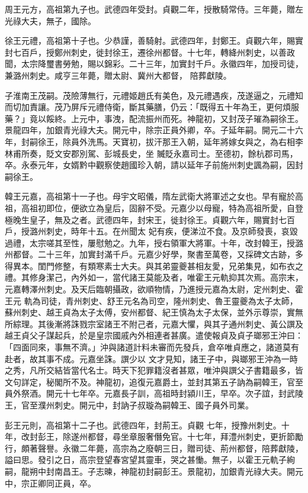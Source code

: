\begin{pinyinscope}
 周王元方，高祖第九子也。武德四年受封。貞觀二年，授散騎常侍。三年薨，贈左光祿大夫，無子，國除。



 徐王元禮，高祖第十子也。少恭謹，善騎射。武德四年，封鄭王。貞觀六年，賜實封七百戶，授鄭州刺史，徙封徐王，遷徐州都督。十七年，轉絳州刺史，以善政聞，太宗降璽書勞勉，賜以錦彩。二十三年，加實封千戶。永徽四年，加授司徒，兼潞州刺史。咸亨三年薨，贈太尉、冀州大都督，
 陪葬獻陵。



 子淮南王茂嗣。茂險薄無行，元禮姬趙氏有美色，及元禮遇疾，茂遂逼之，元禮知而切加責讓。茂乃屏斥元禮侍衛，斷其藥膳，仍云：「既得五十年為王，更何煩服藥？」竟以餒終。上元中，事洩，配流振州而死。神龍初，又封茂子璀為嗣徐王。景龍四年，加銀青光祿大夫。開元中，除宗正員外卿，卒。子延年嗣。開元二十六年，封嗣徐王，除員外洗馬。天寶初，拔汗那王入朝，延年將嫁女與之，為右相李林甫所奏，貶文安郡別駕、彭城長史，坐
 贓貶永嘉司士。至德初，餘杭郡司馬，卒。永泰元年，女婿黔中觀察使趙國珍入朝，請以延年子前施州刺史諷為嗣，因封嗣徐王。



 韓王元嘉，高祖第十一子也。母宇文昭儀，隋左武衛大將軍述之女也。早有寵於高祖，高祖初即位，便欲立為皇后，固辭不受。元嘉少以母寵，特為高祖所愛，自登極晚生皇子，無及之者。武德四年，封宋王，徙封徐王。貞觀六年，賜實封七百戶，授潞州刺史，時年十五。在州聞太
 妃有疾，便涕泣不食。及京師發喪，哀毀過禮，太宗嗟其至性，屢慰勉之。九年，授右領軍大將軍。十年，改封韓王，授潞州都督。二十三年，加實封滿千戶。元嘉少好學，聚書至萬卷，又採碑文古跡，多得異本。閨門修整，有類寒素士大夫。與其弟靈夔甚相友愛，兄弟集見，如布衣之禮。其修身潔己，內外如一，當代諸王莫能及者，唯霍王元軌抑其次焉。高宗末，元嘉轉澤州刺史。及天后臨朝攝政，欲順物情，乃進授元嘉為太尉，定州刺史、霍王元
 軌為司徒，青州刺史、舒王元名為司空，隆州刺史、魯王靈夔為太子太師，蘇州刺史、越王貞為太子太傅，安州都督、紀王慎為太子太保，並外示尊崇，實無所綜理。其後漸將誅戮宗室諸王不附己者，元嘉大懼，與其子通州刺史、黃公譔及越王貞父子謀起兵，於是皇宗國戚內外相連者甚廣。遣使報貞及貞子瑯邪王沖曰：「四面同來，事無不濟。」沖與諸道計料未審而先發兵，倉卒唯貞應之，諸道莫有赴者，故其事不成。元嘉坐誅。譔少以
 文才見知，諸王子中，與瑯邪王沖為一時之秀，凡所交結皆當代名士。時天下犯罪籍沒者甚眾，唯沖與譔父子書籍最多，皆文句詳定，秘閣所不及。神龍初，追復元嘉爵土，並封其第五子訥為嗣韓王，官至員外祭酒。開元十七年卒。元嘉長子訓，高祖時封潁川王，早卒。次子誼，封武陵王，官至濮州刺史。開元中，封訥子叔璇為嗣韓王、國子員外司業。



 彭王元則，高祖第十二子也。武德四年，封荊王。貞觀
 七年，授豫州刺史。十年，改封彭王，除遂州都督，尋坐章服奢僭免官。十七年，拜澧州刺史，更折節勵行，頗著聲譽。永徽二年薨，高宗為之廢朝三日，贈司徒、荊州都督，陪葬獻陵，謚曰思。發引之日，高宗登望春宮望其靈車，哭之甚慟。無子，以霍王元軌子絢嗣，龍朔中封南昌王。子志暕，神龍初封嗣彭王。景龍初，加銀青光祿大夫。開元中，宗正卿同正員，卒。




\end{pinyinscope}
